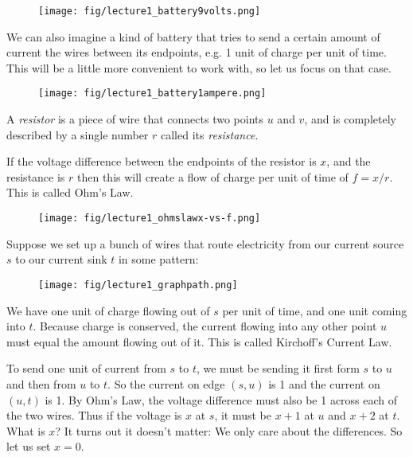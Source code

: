 \begin{figure}[H]
  \centering
  \texttt{[image: fig/lecture1\_battery9volts.png]}
  \label{fig:battery-volt}
\end{figure}

We can also imagine a kind of battery that tries to send a certain
amount of current the wires between its endpoints, e.g. 1 unit of charge per
unit of time.
This will be a little more convenient to work with, so let us focus on
that case.

\begin{figure}[H]
  \centering
  \texttt{[image: fig/lecture1\_battery1ampere.png]}
  \label{fig:battery-current}
\end{figure}

A \emph{resistor} is a piece of wire that connects two
points $u$ and $v$, and is completely described by a single number $r$
called its \emph{resistance}.

If the voltage difference between the endpoints of the resistor is
$x$, and the resistance is $r$ then this will create a flow of charge per unit of time of $f = x / r$.
This is called Ohm's Law.

\begin{figure}[H]
  \centering
  \texttt{[image: fig/lecture1\_ohmslawx-vs-f.png]}
  \label{fig:ohmslaw}
\end{figure}

Suppose we set up a bunch of wires that route electricity from our
current source $s$ to our current sink $t$ in some pattern:

\begin{figure}[H]
  \centering
  \texttt{[image: fig/lecture1\_graphpath.png]}
  \label{fig:graphpath}
\end{figure}

We have one unit of charge flowing out of $s$ per unit of time, and
one unit coming into $t$.
Because charge is conserved, the current flowing into any other point
$u$ must equal the amount flowing out of it.
This is called Kirchoff's Current Law.

To send one unit of current from $s$ to $t$, we must be sending it
first form $s$ to $u$ and then from $u$ to $t$.
So the current on edge $(s,u)$ is 1 and the current on $(u,t)$ is 1.
By Ohm's Law, the voltage difference must also be 1 across each of the two
wires.
Thus if the voltage is $x$ at $s$, it must be $x+1$ at $u$ and $x+2$
at $t$. What is $x$? It turns out it doesn't matter: We only care
about the differences. So let us set $x = 0$.

